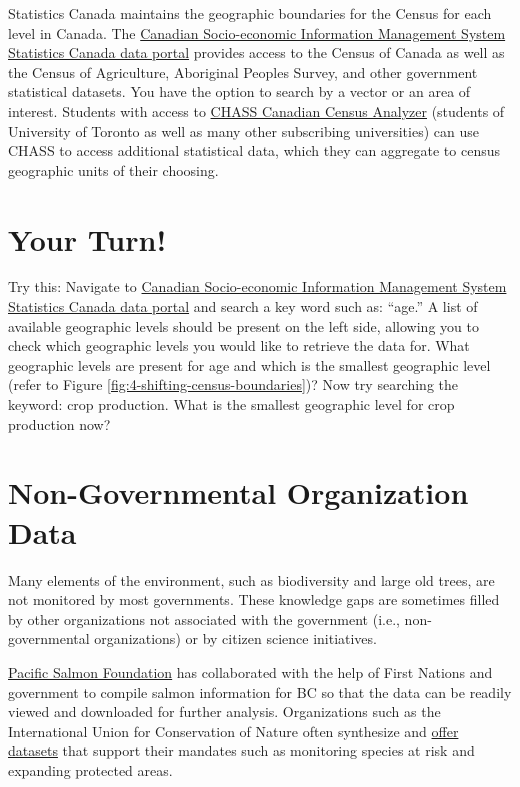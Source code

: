 \documentclass[
]{book}
\begin{document}
Statistics Canada maintains the geographic boundaries for the Census for each level in Canada. The \href{https://www150.statcan.gc.ca/n1/en/type/data}{Canadian Socio-economic Information Management System Statistics Canada data portal} provides access to the Census of Canada as well as the Census of Agriculture, Aboriginal Peoples Survey, and other government statistical datasets. You have the option to search by a vector or an area of interest. Students with access to \href{http://dc1.chass.utoronto.ca/census/index.html}{CHASS Canadian Census Analyzer} (students of University of Toronto as well as many other subscribing universities) can use CHASS to access additional statistical data, which they can aggregate to census geographic units of their choosing.

\section*{Your Turn!}\label{your-turn-2}

Try this: Navigate to \href{https://www150.statcan.gc.ca/n1/en/type/data}{Canadian Socio-economic Information Management System Statistics Canada data portal} and search a key word such as: ``age.'' A list of available geographic levels should be present on the left side, allowing you to check which geographic levels you would like to retrieve the data for. What geographic levels are present for age and which is the smallest geographic level (refer to Figure \ref{fig:4-shifting-census-boundaries})? Now try searching the keyword: crop production. What is the smallest geographic level for crop production now?

\section{Non-Governmental Organization Data}\label{non-governmental-organization-data}

Many elements of the environment, such as biodiversity and large old trees, are not monitored by most governments. These knowledge gaps are sometimes filled by other organizations not associated with the government (i.e., non-governmental organizations) or by citizen science initiatives.

\href{https://www.salmonexplorer.ca/\#!/}{Pacific Salmon Foundation} has collaborated with the help of First Nations and government to compile salmon information for BC so that the data can be readily viewed and downloaded for further analysis. Organizations such as the International Union for Conservation of Nature often synthesize and \href{https://www.iucn.org/resources/conservation-tools}{offer datasets} that support their mandates such as monitoring species at risk and expanding protected areas.
\end{document}
